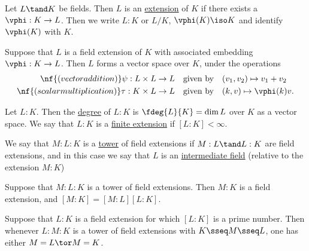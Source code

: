 \documentclass[a4paper]{article}
\begin{document}
\begin{tdefinition}
  Let \( L \tand K \) be fields.
  Then \( L \) is an \ul{extension} of \( K \) if there exists a \homo~\( \vphi: K \to L \).
  Then we write \( L:K \) or \( L/K \), \( \vphi(K)\iso K \) and identify \( \vphi(K) \) with \( K \).
\end{tdefinition}

\quad Suppose that \( L \) is a field extension of \( K \) with associated embedding \( \vphi: K \to L \).
  Then \( L \) forms a vector space over \( K \), under the operations \begin{align*}
    \nf{(vector addition) } \psi: L\times L &\to L \quad \text{given by} \quad (v_1,v_2) \mapsto v_1 + v_2 \\
    \nf{(scalar multiplication) } \tau : K\times  L &\to L \quad \text{given by} \quad (k,v) \mapsto \vphi(k)v.
  \end{align*}

\begin{tdefinition}
  Let \( L: K \).
  Then the \ul{degree} of \( L: K \) is \( \fdeg{L}{K}=\dim L \) over \( K \) as a vector space.
  We say that \( L : K \) is a \ul{finite extension} if \( [L: K] <\infty \).
\end{tdefinition}

\begin{tdefinition}
  We say that \( M : L : K \) is a \ul{tower} of field extensions if \( M : L \tand L: K \) are field extensions, and in this case we say that \( L \) is an \ul{intermediate field} (relative to the extension \( M : K \))
\end{tdefinition}

\begin{ttheorem}
  Suppose that \( M :L: K \) is a tower of field extensions.
  Then \( M : K \) is a field extension, and \( [M : K] = [M : L][L: K] \).
\end{ttheorem}

\begin{tcorollary}
  Suppose that \( L:K \) is a field extension for which \( [L: K] \) is a prime number.
  Then whenever \( L : M : K \) is a tower of field extensions with \( K \sseq M \sseq L \), one has either \( M= L \tor M= K \).
\end{tcorollary}
\end{document}
